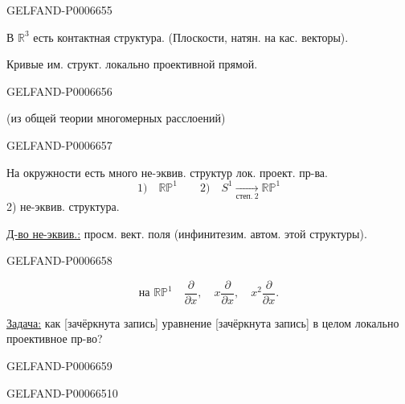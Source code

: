 \begin{GelfandAdjacentEvidence}{GELFAND-P000665}{5}


В \(\mathbb R^3\) есть контактная структура. (Плоскости, натян. на кас. векторы).

Кривые им. структ. локально проективной прямой.
\end{GelfandAdjacentEvidence}
\begin{GelfandAdjacentEvidence}{GELFAND-P000665}{6}


(из общей теории многомерных расслоений)
\end{GelfandAdjacentEvidence}
\begin{GelfandAdjacentEvidence}{GELFAND-P000665}{7}


На окружности есть много не-эквив. структур лок. проект. пр-ва.
\[
1)\quad\mathbb{RP}^1\qquad
2)\quad S^1\xrightarrow[\text{степ.}~2]{}\mathbb{RP}^1
\]
2) не-эквив. структура.

\underline{Д-во не-эквив.:} просм. вект. поля (инфинитезим. автом. этой структуры).
\end{GelfandAdjacentEvidence}
\begin{GelfandAdjacentEvidence}{GELFAND-P000665}{8}

\[
\text{на }\mathbb{RP}^1\quad
\frac{\partial}{\partial x},\quad
x\frac{\partial}{\partial x},\quad x^2\frac{\partial}{\partial x}.
\]

\underline{Задача:} как [зачёркнута запись] уравнение [зачёркнута запись] в целом локально проективное пр-во?
\end{GelfandAdjacentEvidence}
\begin{GelfandAdjacentEvidence}{GELFAND-P000665}{9}

\end{GelfandAdjacentEvidence}
\begin{GelfandAdjacentEvidence}{GELFAND-P000665}{10}

\end{GelfandAdjacentEvidence}

